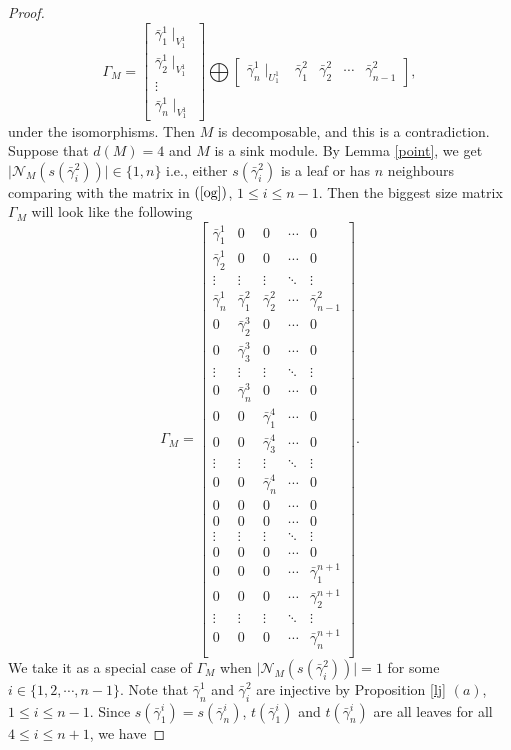 \documentclass[a4paper,12pt]{amsart}
\newcommand{\bg}{\bar{\gamma}}
\newcommand{\cN}{\mathcal{N}}
\begin{document}
\begin{proof}
\begin{equation}
\Gamma_M= \begin{bmatrix}
\bg^1_1\mid_{V^1_1} \\
\bg^1_2\mid_{V^1_1} \\
\vdots \\
\bg^1_{n}\mid_{V^1_1} 
\end{bmatrix} \bigoplus \begin{bmatrix}
\bg^1_n\mid_{U^1_1} & \bg^2_1 & \bg^2_2 & \cdots & \bg^2_{n-1}
\end{bmatrix},
\end{equation}
under the isomorphisms.   Then $M$ is decomposable, and this is a contradiction. Suppose that $d(M)=4$ and $M$ is a sink module.  By Lemma \ref{point},  we get  $\mid\cN_M(s(\bg^2_i))\mid\in \{1,n\}$ i.e., either $s(\bg^2_i)$ is a leaf or has $n$ neighbours comparing  with the matrix in $(\ref{og})$,  $1\leq i\leq n-1$.  Then the biggest size matrix $\Gamma_M$ will look like the following
\begin{equation}\label{bmatrix}
\Gamma_M=\begin{bmatrix}
\bg^1_1 & 0  & 0 & \cdots & 0 \\
\bg^1_2 & 0 & 0& \cdots & 0\\
\vdots &   \vdots & \vdots & \ddots  & \vdots \\
\bg^1_n & \bg^2_1 & \bg^2_2& \cdots & \bg^2_{n-1}\\
0 & \bg^3_2 & 0 & \cdots & 0 \\
0 & \bg^3_3 & 0 & \cdots & 0 \\
\vdots &   \vdots & \vdots & \ddots  & \vdots \\
0 & \bg^3_n & 0 & \cdots & 0 \\
0 & 0 & \bg^4_1 & \cdots & 0 \\
0 & 0 & \bg^4_3 & \cdots & 0 \\
\vdots &   \vdots & \vdots & \ddots  & \vdots \\
0 & 0 & \bg^4_n & \cdots & 0 \\
0 & 0 & 0 & \cdots & 0 \\
0 & 0 & 0 & \cdots & 0 \\
\vdots &   \vdots & \vdots & \ddots  & \vdots \\
0 & 0 & 0 & \cdots & 0 \\
0 & 0 & 0 & \cdots & \bg^{n+1}_1 \\
0 & 0 & 0 & \cdots & \bg^{n+1}_2 \\
\vdots &   \vdots & \vdots & \ddots  & \vdots \\
0 & 0 & 0 & \cdots & \bg^{n+1}_n \\
\end{bmatrix}.
\end{equation}
We take it as a special case of  $\Gamma_M$ when $\mid\cN_M(s(\bg^2_i))\mid=1$ for some $i\in \{1,2,\cdots,n-1\}$. Note that $\bg^1_n$ and $\bg^2_i$ are injective by Proposition \ref{lj} $(a)$, $1\leq i\leq n-1$. Since $s(\bg^i_1)=s(\bg^i_n)$,  $t(\bg^i_1)$ and $t(\bg^i_n)$ are all leaves for all $4 \leq i \leq n+1$, we have 


\end{proof}
\end{document}

